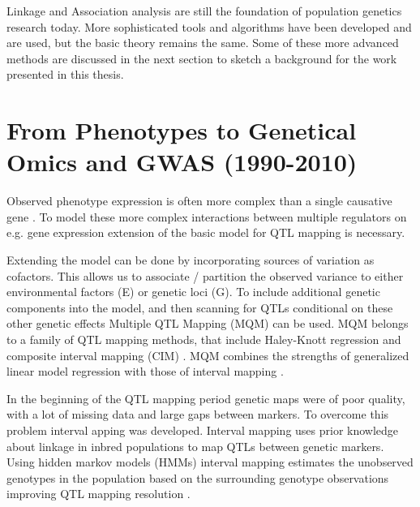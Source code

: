 Linkage and Association analysis are still the foundation of population genetics research 
today. More sophisticated tools and algorithms have been developed and are used, but the 
basic theory remains the same. Some of these more advanced methods are discussed in the next 
section to sketch a background for the work presented in this thesis.

\section{From Phenotypes to Genetical Omics and GWAS (1990-2010)}

Observed phenotype expression is often more complex than a single causative gene \cite{Sinha:2006, 
West:2007}. To model these more complex interactions between multiple regulators on e.g. gene expression 
extension of the basic model for QTL mapping is necessary. 

Extending the model can be done by incorporating sources of variation as cofactors. This allows us 
to associate / partition the observed variance to either environmental factors (E) or genetic loci 
(G). To include additional genetic components into the model, and then scanning for QTLs conditional 
on these other genetic effects Multiple QTL Mapping (MQM) can be used. MQM belongs to a family 
of QTL mapping methods, that include Haley-Knott regression \cite{Haley:1992} and composite 
interval mapping (CIM) \cite{Zeng:1994}. MQM combines the strengths of generalized linear model 
regression with those of interval mapping \cite{Jansen:1993, Jansen:1994b}. 

In the beginning of the QTL mapping period genetic maps were of poor quality, with a lot of missing 
data and large gaps between markers. To overcome this problem interval apping was developed. Interval 
mapping uses prior knowledge about linkage in inbred populations to map QTLs between genetic markers. 
Using hidden markov models (HMMs) interval mapping estimates the unobserved genotypes in the population 
based on the surrounding genotype observations improving QTL mapping resolution \cite{Jansen:1993, Zeng:1994}.

